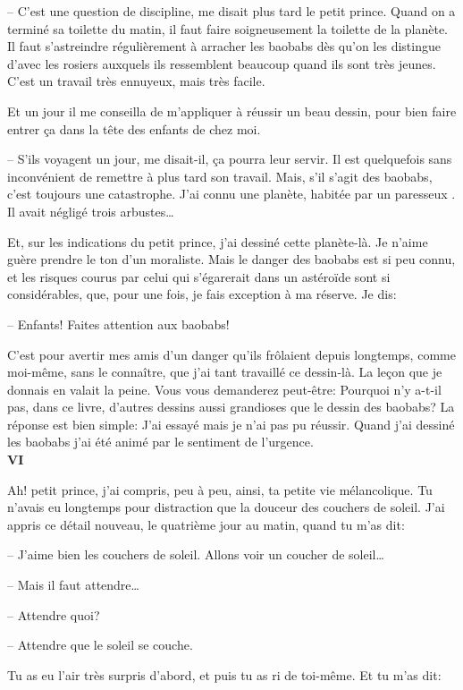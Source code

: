 \begin{Parallel}[p]{}{}
{-- C'est une question de discipline, me disait plus
tard le petit prince. Quand on a terminé sa toilette
du matin, il faut faire soigneusement la toilette de la
planète. Il faut s'astreindre régulièrement à arracher les baobabs dès qu'on les distingue d'avec les
rosiers auxquels ils ressemblent beaucoup quand ils
sont très jeunes. C'est un travail très ennuyeux, mais
très facile.

Et un jour il me conseilla de m'appliquer à réussir
un beau dessin, pour bien faire entrer ça dans la tête
des enfants de chez moi.

-- S'ils voyagent un jour, me disait-il, ça pourra leur servir. Il est quelquefois sans
inconvénient de remettre à plus tard son travail.
Mais, s'il s'agit des baobabs, c'est toujours une catastrophe. J'ai connu une planète, habitée par un paresseux . Il avait négligé trois arbustes\ldots{}

Et, sur les indications du petit prince, j'ai dessiné
cette planète-là. Je n'aime guère prendre le ton
d'un moraliste. Mais le danger des baobabs est si peu connu, et les risques courus par celui qui s'égarerait dans un astéroïde sont si considérables, que, pour une fois, je fais exception à ma réserve. Je dis:

-- Enfants! Faites attention aux baobabs!

C'est pour avertir mes amis d'un danger qu'ils frôlaient
depuis longtemps, comme moi-même, sans le
connaître, que j'ai tant travaillé ce dessin-là. La
leçon que je donnais en valait la peine. Vous vous
demanderez peut-être: Pourquoi n'y a-t-il pas, dans
ce livre, d'autres dessins aussi grandioses que le dessin des baobabs? La réponse est bien simple: J'ai
essayé mais je n'ai pas pu réussir. Quand j'ai dessiné les baobabs j'ai été animé par le sentiment de l'urgence.\\

\textbf{VI}

Ah! petit prince, j'ai compris, peu à peu, ainsi, ta
petite vie mélancolique. Tu n'avais eu longtemps
pour distraction que la douceur des couchers de
soleil. J'ai appris ce détail nouveau, le quatrième
jour au matin, quand tu m'as dit:

-- J'aime bien les couchers de soleil. Allons voir un
coucher de soleil\ldots{}

-- Mais il faut attendre\ldots{}

-- Attendre quoi?

-- Attendre que le soleil se couche.

Tu as eu l'air très surpris d'abord, et puis tu as ri
de toi-même. Et tu m'as dit:

}
\end{Parallel}
